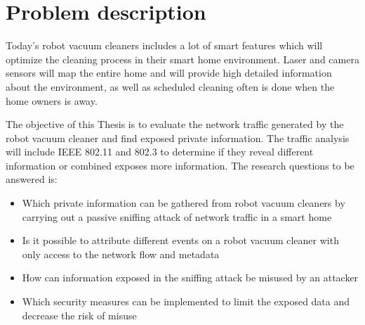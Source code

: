 \chapter*{Problem description}


Today's robot vacuum cleaners includes a lot of smart features which will optimize the cleaning process in their smart home environment. Laser and camera sensors will map the entire home and will provide high detailed information about the environment, as well as scheduled cleaning often is done when the home owners is away.

The objective of this Thesis is to evaluate the network traffic generated by the robot vacuum cleaner and find exposed private information. The traffic analysis will include IEEE 802.11 and 802.3 to determine if they reveal different information or combined exposes more information. The research questions to be answered is: 
\begin{itemize}
    \item Which private information can be gathered from robot vacuum cleaners by carrying out a passive sniffing attack of network traffic in a smart home
    \item Is it possible to attribute different events on a robot vacuum cleaner with only access to the network flow and metadata
    \item How can information exposed in the sniffing attack be misused by an attacker
    \item Which security measures can be implemented to limit the exposed data and decrease the risk of misuse 
\end{itemize}



